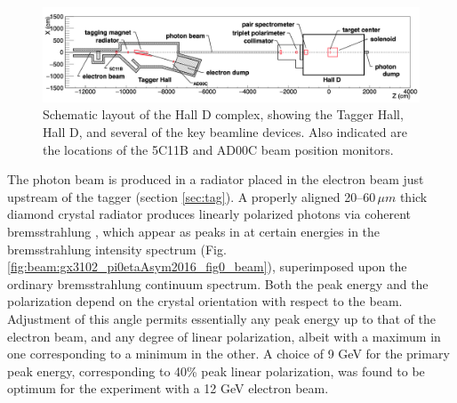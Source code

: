 \begin{figure}[t]
\begin{center}
 \includegraphics[clip=true,width=0.98\linewidth]{figures/Draw_beamline.png}
\end{center}
\caption{Schematic layout of the Hall D complex, showing the Tagger Hall, Hall D, and
several of the key beamline devices.
Also indicated are the locations of the 5C11B and AD00C beam position monitors.
        }
\label{fig:beam:Draw_beamline} 
\end{figure}

The photon beam is produced in a radiator placed in the electron beam just upstream of the
tagger (section \ref{sec:tag}). A properly aligned 20--60\,$\mu m$ thick diamond crystal
radiator produces
linearly polarized photons via coherent brems\-strah\-lung \cite{timm1969,LIVINGSTON2009205},
which appear as peaks in at certain energies in the brems\-strah\-lung intensity spectrum (Fig.\,\ref{fig:beam:gx3102_pi0etaAsym2016_fig0_beam}), superimposed upon the ordinary brems\-strah\-lung
continuum spectrum.
Both the peak energy and the polarization depend on the crystal orientation with respect to the beam.
Adjustment of this angle permits essentially any peak energy up to that of the electron beam, and any
degree of linear polarization, albeit with a maximum in one corresponding to a minimum in the other.
A choice of 9 GeV for the primary peak energy, corresponding to 40\% peak linear polarization,
was found to be optimum for the \GX{} experiment with a 12 GeV electron beam.

